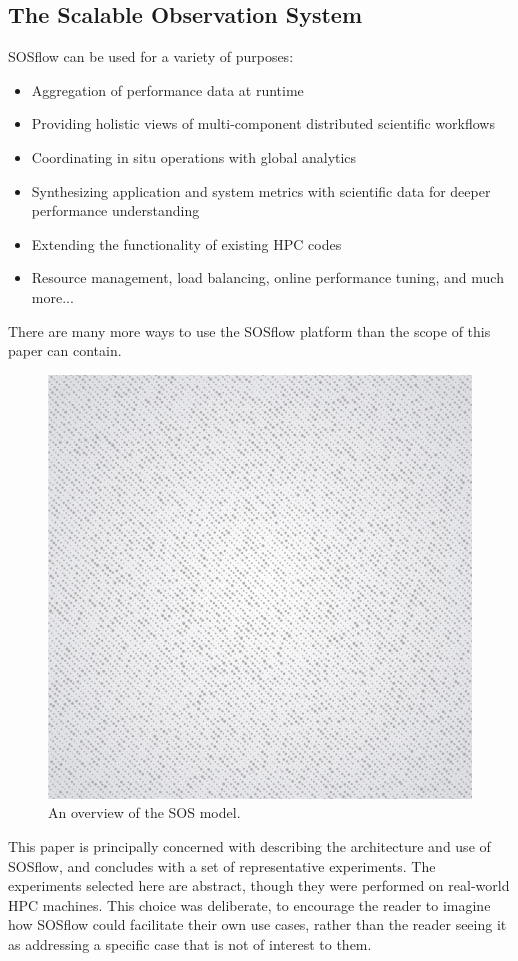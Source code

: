 \subsection{The Scalable Observation System} %
%
SOSflow can be used for a variety of
purposes:
\begin{itemize}
    \item Aggregation of performance data at runtime
    \item Providing holistic views of multi-component
        distributed scientific workflows
    \item Coordinating in situ operations with global
        analytics
    \item Synthesizing application and system metrics
        with scientific data for deeper performance
        understanding
    \item Extending the functionality of existing HPC
        codes
    \item Resource management, load balancing, online
        performance tuning, and much more...
\end{itemize}
%
There are many more ways to use the SOSflow platform than the scope of this
paper can contain.
%
\begin{figure}[h]
\centering
\includegraphics[width=\columnwidth]{images/placeholder.jpg}
\caption{An overview of the SOS model.}
\label{fig_sos_overview}
\end{figure}
%
This paper is principally concerned with describing the architecture and use
of SOSflow, and concludes with a set of representative experiments.
%
The experiments selected here are abstract, though they were performed on
real-world HPC machines.
%
This choice was deliberate, to encourage the reader to imagine how SOSflow
could facilitate their own use cases, rather than the reader seeing it as
addressing a specific case that is not of interest to them.
%

